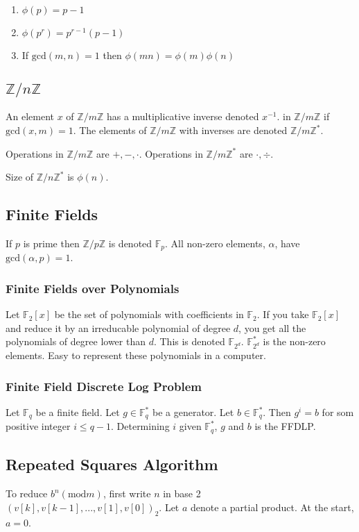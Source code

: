 \documentclass{article}
\begin{document}
\begin{enumerate}
  \item $\phi(p) = p-1$
  \item $\phi(p^r) = p^{r-1}(p-1)$
  \item If $\text{gcd}(m,n) = 1$ then $\phi(mn)= \phi(m) \phi(n)$
\end{enumerate}

\subsection{$\mathbb{Z} / n\mathbb{Z}$}
An element $x$ of $\mathbb{Z}/m\mathbb{Z}$ has a multiplicative inverse denoted
$x^{-1}$. in $\mathbb{Z}/m\mathbb{Z}$ if $\text{gcd}(x,m)=1$. The elements of
$\mathbb{Z}/m\mathbb{Z}$ with inverses are denoted $\mathbb{Z}/m\mathbb{Z}^*$.

Operations in $\mathbb{Z}/m\mathbb{Z}$ are $+, -, \cdot$. Operations in
$\mathbb{Z}/m\mathbb{Z}^*$ are $\cdot, \div$.

Size of $\mathbb{Z}/n\mathbb{Z}^*$ is $\phi(n)$.

\subsection{Finite Fields}
If $p$ is prime then $\mathbb{Z}/p\mathbb{Z}$ is denoted $\mathbb{F}_p$. All
non-zero elements, $\alpha$, have $\text{gcd}(\alpha, p) = 1$.

\subsubsection{Finite Fields over Polynomials}
Let $\mathbb{F}_2[x]$ be the set of polynomials with coefficients in
$\mathbb{F}_2$. If you take $\mathbb{F}_2[x]$ and reduce it by an irreducable
polynomial of degree $d$, you get all the polynomials of degree lower than $d$.
This is denoted $\mathbb{F}_{2^d}$. $\mathbb{F}_{2^d}^{*}$ is the non-zero
elements. Easy to represent these polynomials in a computer.

\subsubsection{Finite Field Discrete Log Problem}
Let $\mathbb{F}_q$ be a finite field. Let $g \in \mathbb{F}_q^*$ be a
generator. Let $b \in \mathbb{F}_q^*$. Then $g^i = b$ for som positive integer
$i \leq q-1$. Determining $i$ given $\mathbb{F}_q^*$, $g$ and $b$ is the FFDLP.

\subsection{Repeated Squares Algorithm}
To reduce $b^n(\text{mod}m)$, first write $n$ in base 2
$(v[k],v[k-1],...,v[1],v[0])_2$. Let $a$ denote a partial product. At the
start, $a=0$.
\end{document}
